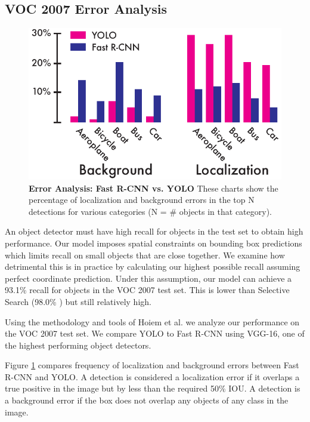 \documentclass{article} %
\begin{document}
\subsection{VOC 2007 Error Analysis}
\label{error}

\begin{figure}
      \centering
        \includegraphics[width=\linewidth]{errors}
      \caption{\textbf{Error Analysis: Fast R-CNN vs. YOLO} These charts show the percentage of localization and background errors in the top N detections for various categories (N = \# objects in that category).}
      \label{errors}
   \end{figure}

An object detector must have high recall for objects in the test set to obtain high performance. Our model imposes spatial constraints on bounding box predictions which limits recall on small objects that are close together. We examine how detrimental this is in practice by calculating our highest possible recall assuming perfect coordinate prediction. Under this assumption, our model can achieve a 93.1\% recall for objects in the VOC 2007 test set. This is lower than Selective Search (98.0\% \cite{uijlings2013selective}) but still relatively high.

Using the methodology and tools of Hoiem et al. \cite{hoiem2012diagnosing} we analyze our performance on the VOC 2007 test set. We compare YOLO to Fast R-CNN using VGG-16, one of the highest performing object detectors.

Figure \ref{errors} compares frequency of localization and background errors between Fast R-CNN and YOLO. A detection is considered a localization error if it overlaps a true positive in the image but by less than the required 50\% IOU. A detection is a background error if the box does not overlap any objects of any class in the image.
\end{document}
